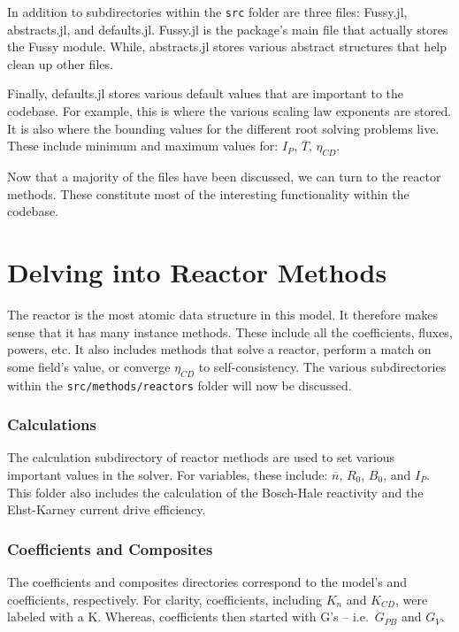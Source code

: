 In addition to subdirectories within the \texttt{src} folder are three files: Fussy.jl, abstracts.jl, and defaults.jl. Fussy.jl is the package's main file that actually stores the Fussy module. While, abstracts.jl stores various abstract structures that help clean up other files.

Finally, defaults.jl stores various default values that are important to the codebase. For example, this is where the various scaling law exponents are stored. It is also where the bounding values for the different root solving problems live. These include minimum and maximum values for: $I_P$, $\overline T$, $\eta_{CD}$.

Now that a majority of the files have been discussed, we can turn to the reactor methods. These constitute most of the interesting functionality within the codebase.

\section{Delving into Reactor Methods}

The reactor is the most atomic data structure in this model. It therefore makes sense that it has many instance methods. These include all the coefficients, fluxes, powers, etc. It also includes methods that solve a reactor, perform a match on some field's value, or converge $\eta_{CD}$ to self-consistency. The various subdirectories within the \texttt{src/methods/reactors} folder will now be discussed.

\subsubsection{Calculations}

The calculation subdirectory of reactor methods are used to set various important values in the solver. For  variables, these include: $\overline n$, $R_0$, $B_0$, and $I_P$. This folder also includes the calculation of the Bosch-Hale reactivity and the Ehst-Karney current drive efficiency.

\subsubsection{Coefficients and Composites}

The coefficients and composites directories correspond to the model's  and  coefficients, respectively. For clarity,  coefficients, including $K_n$ and $K_{CD}$, were labeled with a K. Whereas,  coefficients then started with G's -- i.e.\ $G_{PB}$ and $G_V$.

